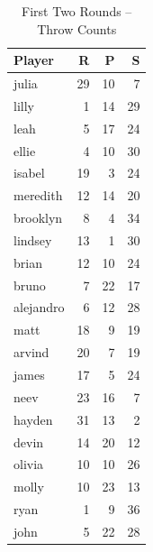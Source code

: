 \documentclass[12pt]{article}
\begin{document}
\begin{multicols}{2}
\begin{table}[H]
\centering
\caption{First Two Rounds – Throw Counts}
\label{tab:first2_counts}
\begin{tabular}{lrrr}
\toprule
\textbf{Player} & \textbf{R} & \textbf{P} & \textbf{S} \\
\midrule
julia & 29 & 10 & 7 \\
lilly & 1 & 14 & 29 \\
leah & 5 & 17 & 24 \\
ellie & 4 & 10 & 30 \\
isabel & 19 & 3 & 24 \\
meredith & 12 & 14 & 20 \\
brooklyn & 8 & 4 & 34 \\
lindsey & 13 & 1 & 30 \\
brian & 12 & 10 & 24 \\
bruno & 7 & 22 & 17 \\
alejandro & 6 & 12 & 28 \\
matt & 18 & 9 & 19 \\
arvind & 20 & 7 & 19 \\
james & 17 & 5 & 24 \\
neev & 23 & 16 & 7 \\
hayden & 31 & 13 & 2 \\
devin & 14 & 20 & 12 \\
olivia & 10 & 10 & 26 \\
molly & 10 & 23 & 13 \\
ryan & 1 & 9 & 36 \\
john & 5 & 22 & 28 \\
\bottomrule
\end{tabular}
\end{table}


\end{multicols}
\end{document}
